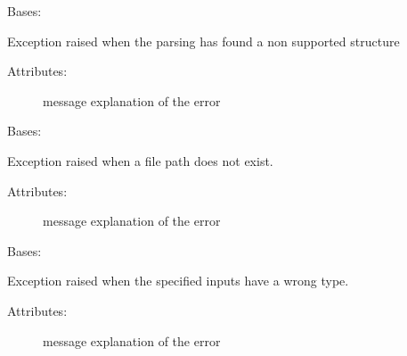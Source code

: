 
\begin{fulllineitems}
\label{\detokenize{eboa.engine:eboa.engine.errors.ErrorParsingDictionary}}
Bases: {\hyperref[\detokenize{eboa.engine:eboa.engine.errors.Error}]{}}

Exception raised when the parsing has found a non supported structure
\begin{description}
\item[{Attributes:}] \leavevmode
message \textendash{} explanation of the error

\end{description}

\end{fulllineitems}


\begin{fulllineitems}
\label{\detokenize{eboa.engine:eboa.engine.errors.FilePathDoesNotExist}}
Bases: {\hyperref[\detokenize{eboa.engine:eboa.engine.errors.Error}]{}}

Exception raised when a file path does not exist.
\begin{description}
\item[{Attributes:}] \leavevmode
message \textendash{} explanation of the error

\end{description}

\end{fulllineitems}


\begin{fulllineitems}
\label{\detokenize{eboa.engine:eboa.engine.errors.InputError}}
Bases: {\hyperref[\detokenize{eboa.engine:eboa.engine.errors.Error}]{}}

Exception raised when the specified inputs have a wrong type.
\begin{description}
\item[{Attributes:}] \leavevmode
message \textendash{} explanation of the error

\end{description}

\end{fulllineitems}

